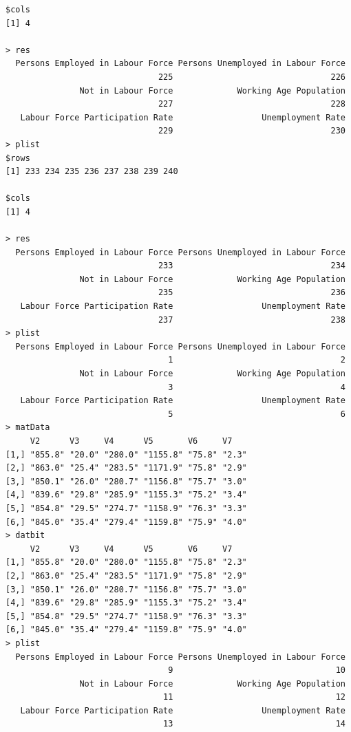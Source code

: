\documentclass[a4paper]{article}
\begin{document}
\begin{verbatim}
$cols
[1] 4

> res 
  Persons Employed in Labour Force Persons Unemployed in Labour Force 
                               225                                226 
               Not in Labour Force             Working Age Population 
                               227                                228 
   Labour Force Participation Rate                  Unemployment Rate 
                               229                                230 
> plist 
$rows
[1] 233 234 235 236 237 238 239 240

$cols
[1] 4

> res 
  Persons Employed in Labour Force Persons Unemployed in Labour Force 
                               233                                234 
               Not in Labour Force             Working Age Population 
                               235                                236 
   Labour Force Participation Rate                  Unemployment Rate 
                               237                                238 
> plist 
  Persons Employed in Labour Force Persons Unemployed in Labour Force 
                                 1                                  2 
               Not in Labour Force             Working Age Population 
                                 3                                  4 
   Labour Force Participation Rate                  Unemployment Rate 
                                 5                                  6 
> matData 
     V2      V3     V4      V5       V6     V7   
[1,] "855.8" "20.0" "280.0" "1155.8" "75.8" "2.3"
[2,] "863.0" "25.4" "283.5" "1171.9" "75.8" "2.9"
[3,] "850.1" "26.0" "280.7" "1156.8" "75.7" "3.0"
[4,] "839.6" "29.8" "285.9" "1155.3" "75.2" "3.4"
[5,] "854.8" "29.5" "274.7" "1158.9" "76.3" "3.3"
[6,] "845.0" "35.4" "279.4" "1159.8" "75.9" "4.0"
> datbit 
     V2      V3     V4      V5       V6     V7   
[1,] "855.8" "20.0" "280.0" "1155.8" "75.8" "2.3"
[2,] "863.0" "25.4" "283.5" "1171.9" "75.8" "2.9"
[3,] "850.1" "26.0" "280.7" "1156.8" "75.7" "3.0"
[4,] "839.6" "29.8" "285.9" "1155.3" "75.2" "3.4"
[5,] "854.8" "29.5" "274.7" "1158.9" "76.3" "3.3"
[6,] "845.0" "35.4" "279.4" "1159.8" "75.9" "4.0"
> plist 
  Persons Employed in Labour Force Persons Unemployed in Labour Force 
                                 9                                 10 
               Not in Labour Force             Working Age Population 
                                11                                 12 
   Labour Force Participation Rate                  Unemployment Rate 
                                13                                 14 

\end{verbatim}
\end{document}
